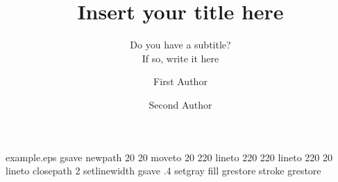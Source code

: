 %
%
%
%
%
\begin{filecontents*}{example.eps}
gsave
newpath
  20 20 moveto
  20 220 lineto
  220 220 lineto
  220 20 lineto
closepath
2 setlinewidth
gsave
  .4 setgray fill
grestore
stroke
grestore
\end{filecontents*}
%
\RequirePackage{fix-cm}
%
\documentclass[twocolumn,epjc3]{svjour3}  
%
\smartqed  %
%
\RequirePackage{graphicx}
%
%
%
%
%


\title{Insert your title here%
}
\subtitle{Do you have a subtitle?\\ If so, write it here}


\author{First Author
        \and
        Second Author %
}





